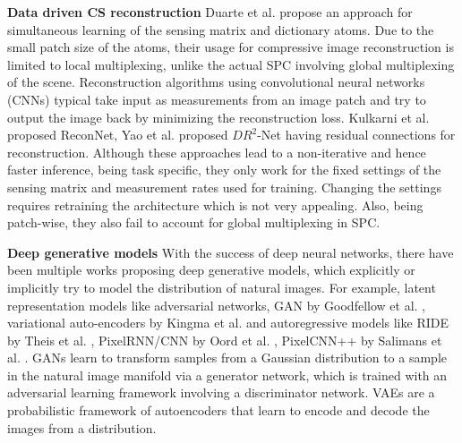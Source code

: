 \documentclass[journal,twoside]{IEEEtran}
\begin{document}
\textbf{Data driven CS reconstruction} Duarte et al. \cite{duarte2009learning} propose an approach for simultaneous learning of the sensing matrix and dictionary atoms. Due to the small patch size of the atoms, their usage for compressive image reconstruction is limited to local multiplexing, unlike the actual SPC involving global multiplexing of the scene. Reconstruction algorithms using convolutional neural networks (CNNs) typical take input as measurements from an image patch and try to output the image back by minimizing the reconstruction loss. Kulkarni et al. \cite{kulkarni2016reconnet} proposed ReconNet, Yao et al. \cite{yao2017dr} proposed $DR^2$-Net having residual connections for reconstruction. Although these approaches lead to a non-iterative and hence faster inference, being task specific, they only work for the fixed settings of the sensing matrix and measurement rates used for training. Changing the settings requires retraining the architecture which is not very appealing. Also, being patch-wise, they also fail to account for global multiplexing in SPC. 

\textbf{Deep generative models}
With the success of deep neural networks, there have been multiple works proposing deep generative models, which explicitly or implicitly try to model the distribution of natural images. For example, latent representation models like adversarial networks, GAN by Goodfellow et al. \cite{goodfellow2014generative}, variational auto-encoders by Kingma et al. \cite{kingma2013auto} and autoregressive models like RIDE by Theis et al. \cite{theis2015generative}, PixelRNN/CNN by Oord et al. \cite{van2016pixel}, PixelCNN++ by Salimans et al. \cite{salimans2017pixelcnn++}. GANs learn to transform samples from a Gaussian distribution to a sample in the natural image manifold via a generator network, which is trained with an adversarial learning framework involving a discriminator network. VAEs are a probabilistic framework of autoencoders that learn to encode and decode the images from a distribution. 
\end{document}
